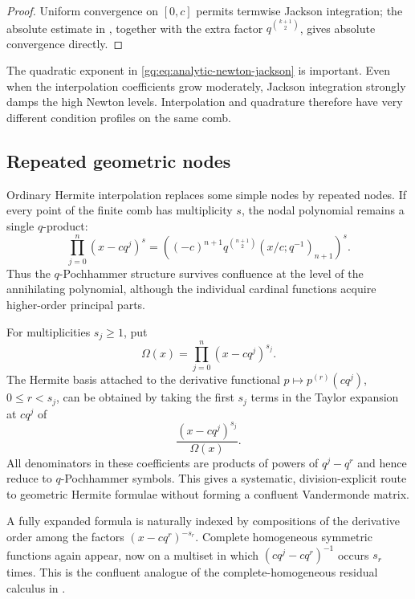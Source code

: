 \begin{proof}
Uniform convergence on $[0,c]$ permits termwise Jackson integration; the
absolute estimate in , together with
the extra factor $q^{\binom{k+1}{2}}$, gives absolute convergence directly.
\end{proof}

The quadratic exponent in \eqref{gq:eq:analytic-newton-jackson} is important.
Even when the interpolation coefficients grow moderately, Jackson
integration strongly damps the high Newton levels.  Interpolation and
quadrature therefore have very different condition profiles on the same
comb.

\subsection{Repeated geometric nodes}

Ordinary Hermite interpolation replaces some simple nodes by repeated
nodes.  If every point of the finite comb has multiplicity $s$, the nodal
polynomial remains a single $q$-product:
\begin{equation}
 \prod_{j=0}^{n}(x-cq^j)^s
 =\left((-c)^{n+1}q^{\binom{n+1}{2}}
        (x/c;q^{-1})_{n+1}\right)^s.
 \label{gq:eq:uniform-confluent-q-product}
\end{equation}
Thus the $q$-Pochhammer structure survives confluence at the level of the
annihilating polynomial, although the individual cardinal functions acquire
higher-order principal parts.

For multiplicities $s_j\ge1$, put
\[
 \Omega(x)=\prod_{j=0}^{n}(x-cq^j)^{s_j}.
\]
The Hermite basis attached to the derivative functional
$p\mapsto p^{(r)}(cq^j)$, $0\le r<s_j$, can be obtained by taking the first
$s_j$ terms in the Taylor expansion at $cq^j$ of
\begin{equation}
 \frac{(x-cq^j)^{s_j}}{\Omega(x)}.
 \label{gq:eq:confluent-reciprocal-germ}
\end{equation}
All denominators in these coefficients are products of powers of
$q^j-q^r$ and hence reduce to $q$-Pochhammer symbols.  This gives a
systematic, division-explicit route to geometric Hermite formulae without
forming a confluent Vandermonde matrix.

\begin{remark}
A fully expanded formula is naturally indexed by compositions of the
derivative order among the factors $(x-cq^r)^{-s_r}$.  Complete homogeneous
symmetric functions again appear, now on a multiset in which
$(cq^j-cq^r)^{-1}$ occurs $s_r$ times.  This is the confluent analogue of the
complete-homogeneous residual calculus in .
\end{remark}

